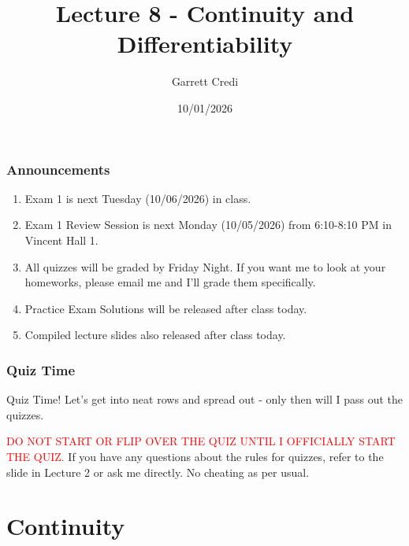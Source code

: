 \documentclass{ltx-talk}
\title{Lecture 8 - Continuity and Differentiability}
\author{Garrett Credi}
\date{10/01/2026}
\begin{document}
\begin{frame}
  \maketitle
\end{frame}

\begin{frame}
  \frametitle{Announcements}

  \begin{enumerate}
    \item Exam 1 is next Tuesday (10/06/2026) in class. 
    \item Exam 1 Review Session is next Monday (10/05/2026) from 6:10-8:10 PM in Vincent Hall 1.
    \item All quizzes will be graded by Friday Night. If you want me to look at your homeworks, please email me and I'll grade them specifically.
    \item Practice Exam Solutions will be released after class today.
    \item Compiled lecture slides also released after class today.
  \end{enumerate}
\end{frame}

\begin{frame}
  \frametitle{Quiz Time}

  Quiz Time! Let's get into neat rows and spread out - only then will I pass out the quizzes.

  \textcolor{red}{DO NOT START OR FLIP OVER THE QUIZ UNTIL I OFFICIALLY START THE QUIZ.} If you have any questions about the rules for quizzes, refer to the slide in Lecture 2 or ask me directly. No cheating as per usual.
\end{frame}

\section{Continuity}
\end{document}
